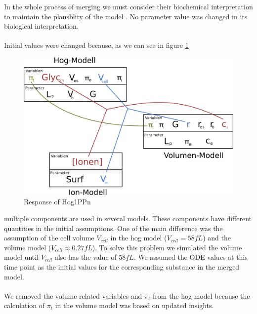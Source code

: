In the whole process of merging we must consider their biochemical interpretation to maintain the plausblity of the model \cite{Liebermeister2008ValidityAC}. No parameter value was changed in its biological interpretation.\\\\
Initial values were changed because, as we can see in figure \ref{IntersectionsOfTheModels}

\begin{figure}[h!]
	\begin{center}
		\begin{minipage}{0,8\textwidth}
			
			\includegraphics[width=\textwidth]{picture/model_intersections.png}
			\caption{Response of Hog1PPn} 
			\label{IntersectionsOfTheModels} 
		\end{minipage}
	\end{center}
\end{figure}

 multiple components are used in several models. These components have different quantities in the initial assumptions. One of the main difference was the assumption of the cell volume $V_{cell}$ in the hog model ($V_{cell}=58fL $) and the volume model ($V_{cell} \approx 0.27fL$). To solve this problem we simulated the volume model until $V_{cell}$ also has the value of $58fL$. We assumed the ODE values at this time point as the initial values for the corresponding substance in the merged model. \\\\
We removed the volume related variables and $\pi_t$ from the hog model because the calculation of $\pi_t$ in the volume model was based on updated insights.


